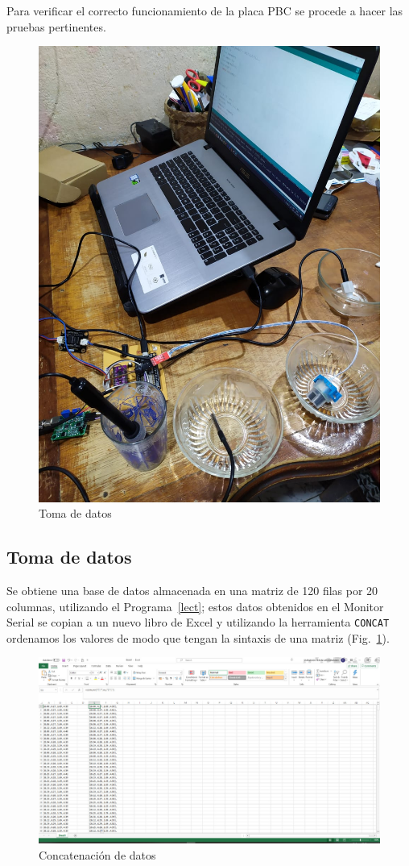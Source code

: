 \documentclass[10pt,a4paper]{article}
\begin{document}
Para verificar el correcto funcionamiento de la placa PBC se procede a hacer las pruebas pertinentes.
\begin{figure}[H]
\centering
\includegraphics[scale=0.2]{muestras}
\caption{Toma de datos}
\end{figure}
\subsection{Toma de datos}
Se obtiene una base de datos almacenada en una matriz de 120 filas por 20 columnas, utilizando el Programa~\ref{lect}; estos datos obtenidos en el Monitor Serial se copian a un nuevo libro de Excel y utilizando la herramienta \lstinline!CONCAT! ordenamos los valores de modo que tengan la sintaxis de una matriz (Fig.~\ref{excel}).

\begin{figure}[H]
\centering
\includegraphics[scale=0.35]{excel}
\caption{Concatenación de datos}
\label{excel}
\end{figure}
\end{document}

